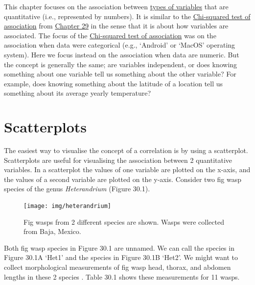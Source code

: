 \documentclass[
  openany]{scrbook}
\begin{document}
This chapter focuses on the association between \protect\hyperlink{Chapter_5}{types of variables} that are quantitative (i.e., represented by numbers).
It is similar to the \protect\hyperlink{chi-squared-test-of-association}{Chi-squared test of association} from \protect\hyperlink{Chapter_29}{Chapter 29} in the sense that it is about how variables are associated.
The focus of the \protect\hyperlink{chi-squared-test-of-association}{Chi-squared test of association} was on the association when data were categorical (e.g., `Android' or `MacOS' operating system).
Here we focus instead on the association when data are numeric.
But the concept is generally the same; are variables independent, or does knowing something about one variable tell us something about the other variable?
For example, does knowing something about the latitude of a location tell us something about its average yearly temperature?

\hypertarget{scatterplots}{%
\section{Scatterplots}\label{scatterplots}}

The easiest way to visualise the concept of a correlation is by using a scatterplot.
Scatterplots are useful for visualising the association between 2 quantitative variables.
In a scatterplot the values of one variable are plotted on the x-axis, and the values of a second variable are plotted on the y-axis.
Consider two fig wasp species of the genus \emph{Heterandrium} (Figure 30.1).

\begin{figure}
\texttt{[image: img/heterandrium]} \caption{Fig wasps from 2 different species are shown. Wasps were collected from Baja, Mexico.}\label{fig:unnamed-chunk-125}
\end{figure}

Both fig wasp species in Figure 30.1 are unnamed.
We can call the species in Figure 30.1A `Het1' and the species in Figure 30.1B `Het2'.
We might want to collect morphological measurements of fig wasp head, thorax, and abdomen lengths in these 2 species \citep{Duthie2015b}.
Table 30.1 shows these measurements for 11 wasps.
\end{document}
